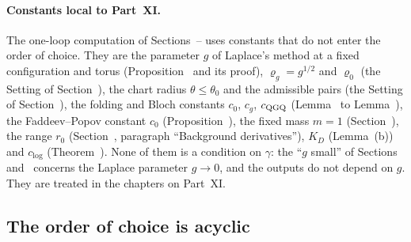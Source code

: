 \paragraph{Constants local to Part~XI.} The one-loop computation of Sections~-- uses constants that do not enter the order of choice. They are the parameter $g$ of Laplace's method at a fixed configuration and torus (Proposition~ and its proof), $\varrho_g=g^{1/2}$ and $\varrho_0$ (the Setting of Section~), the chart radius $\theta\le\theta_0$ and the admissible pairs (the Setting of Section~), the folding and Bloch constants $c_0$, $c_g$, $c_{\rm QGQ}$ (Lemma~ to Lemma~), the Faddeev--Popov constant $c_0$ (Proposition~), the fixed mass $m=1$ (Section~), the range $r_0$ (Section~, paragraph ``Background derivatives''), $K_D$ (Lemma~(b)) and $c_{\log}$ (Theorem~). None of them is a condition on $\gamma$: the ``$g$ small'' of Sections~ and~ concerns the Laplace parameter $g\to0$, and the outputs do not depend on $g$. They are treated in the chapters on Part~XI.

\subsection{The order of choice is acyclic}\label{subsec:ledger-order}

